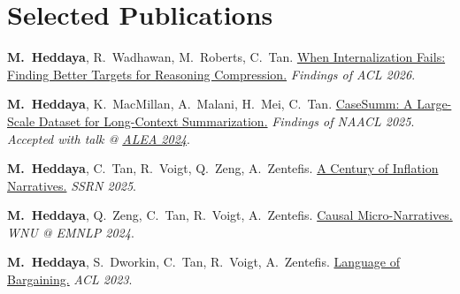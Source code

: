 \documentclass[11pt,letterpaper]{article}
\begin{document}
\section*{Selected Publications}
\vspace{4pt}
\begin{enumerate}[label={[\arabic*]}, leftmargin=2em, topsep=2pt, itemsep=1pt, parsep=0pt]
    \item \textbf{M.\ Heddaya}, R.\ Wadhawan, M.\ Roberts, C.\ Tan. \href{https://mheddaya.com/papers/acl2026_abridge.pdf}{When Internalization Fails: Finding Better Targets for Reasoning Compression.} \textit{Findings of ACL 2026}.
    \item \textbf{M.\ Heddaya}, K.\ MacMillan, A.\ Malani, H.\ Mei, C.\ Tan. \href{https://arxiv.org/abs/2501.00097}{CaseSumm: A Large-Scale Dataset for Long-Context Summarization.} \textit{Findings of NAACL 2025}. \textit{Accepted with talk @ \href{https://www.amlecon.org}{ALEA 2024}}.
    \item \textbf{M.\ Heddaya}, C.\ Tan, R.\ Voigt, Q.\ Zeng, A.\ Zentefis. \href{https://papers.ssrn.com/sol3/papers.cfm?abstract_id=5259107}{A Century of Inflation Narratives.} \textit{SSRN 2025}.
    \item \textbf{M.\ Heddaya}, Q.\ Zeng, C.\ Tan, R.\ Voigt, A.\ Zentefis. \href{https://aclanthology.org/2024.wnu-1.12/}{Causal Micro-Narratives.} \textit{WNU @ EMNLP 2024}.
    \item \textbf{M.\ Heddaya}, S.\ Dworkin, C.\ Tan, R.\ Voigt, A.\ Zentefis. \href{https://aclanthology.org/2023.acl-long.735/}{Language of Bargaining.} \textit{ACL 2023}.
\end{enumerate}

\end{document}
